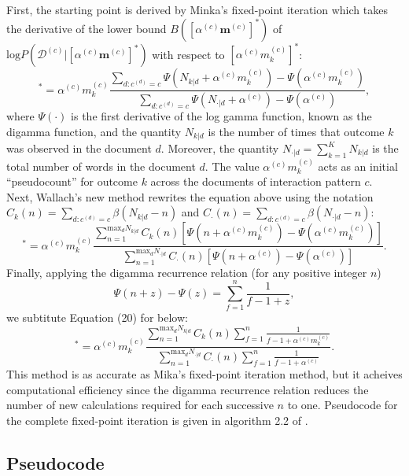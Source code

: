 \documentclass[a4paper]{article}
\begin{document}
 \newline First, the starting point is derived by Minka’s fixed-point iteration which takes the derivative of the lower bound $B([\alpha^{(c)}\boldsymbol{m}^{(c)}]^*)$ of $\mbox{log}P(\mathcal{D}^{(c)}|[\alpha^{(c)}\boldsymbol{m}^{(c)}]^*)$ with respect to $[\alpha^{(c)} {m^{(c)}_k}]^*$:
 \begin{equation}
 [\alpha^{(c)} m^{(c)}_k]^*=\alpha^{(c)} m^{(c)}_k\frac{\sum_{d:c^{(d)}=c}\Psi(N_{k|d}+\alpha^{(c)} m^{(c)}_k)-\Psi(\alpha^{(c)} m^{(c)}_k)}{\sum_{d:c^{(d)}=c}\Psi(N_{\cdot|d}+\alpha^{(c)})-\Psi(\alpha^{(c)})},
 \end{equation}
 where $\Psi(\cdot)$ is the first derivative of the log gamma function, known as the digamma function, and the quantity $N_{k|d}$ is the number of times that outcome $k$ was observed in the document $d$. Moreover, the quantity $N_{\cdot|d}=\sum_{k=1}^K N_{k|d}$ is the total number of words in the document $d$. The
 value $\alpha^{(c)} m^{(c)}_k$ acts as an initial “pseudocount” for outcome $k$ across the documents of interaction pattern $c$.\\ \newline
 Next, Wallach's new method rewrites the equation above using the notation $C_k(n)=\sum\limits_{d:c^{(d)}=c}\beta(N_{k|d}-n)$ and $C_\cdot(n)=\sum\limits_{d:c^{(d)}=c}\beta(N_{\cdot|d}-n)$:
 \begin{equation}
 [\alpha^{(c)} m^{(c)}_k]^*=\alpha^{(c)} m^{(c)}_k\frac{\sum_{n=1}^{\mbox{max}_dN_{k|d}}C_k(n)[\Psi(n+\alpha^{(c)} m^{(c)}_k)-\Psi(\alpha^{(c)} m^{(c)}_k)]}{\sum_{n=1}^{\mbox{max}_dN_{\cdot|d}}C_\cdot(n)[\Psi(n+\alpha^{(c)})-\Psi(\alpha^{(c)})]}.
 \end{equation}
 Finally, applying the digamma recurrence relation (for any positive integer $n$) $$\Psi(n+z)-\Psi(z)=\sum_{f=1}^{n}\frac{1}{f-1+z},$$ we subtitute Equation (20) for below:
 \begin{equation}
 [\alpha^{(c)} m^{(c)}_k]^*=\alpha^{(c)} m^{(c)}_k\frac{\sum_{n=1}^{\mbox{max}_dN_{k|d}}C_k(n)\sum_{f=1}^n \frac{1}{f-1+\alpha^{(c)} m^{(c)}_k}}{\sum_{n=1}^{\mbox{max}_dN_{\cdot|d}}C_\cdot(n)\sum_{f=1}^n \frac{1}{f-1+\alpha^{(c)}}}.
 \end{equation}
 This method is as accurate as Mika's fixed-point iteration method, but it acheives computational efficiency since the digamma recurrence relation reduces the number of new calculations required for each successive $n$ to one. Pseudocode
 for the complete fixed-point iteration is given in algorithm 2.2 of \cite{wallach2008structured}. \subsection{Pseudocode}
\end{document}

